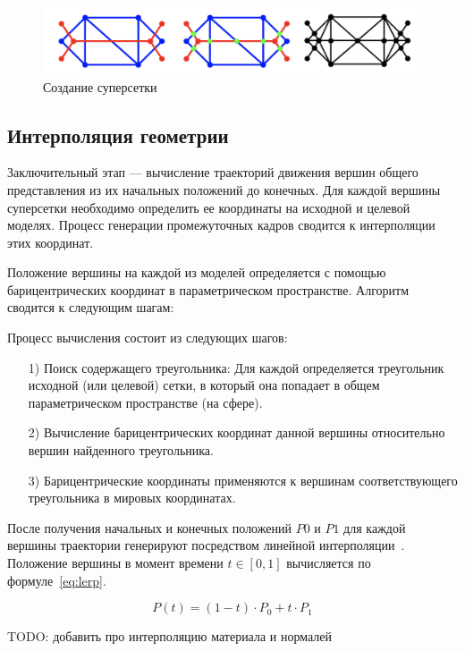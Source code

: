 \begin{figure}[H]
    \centering
    \includegraphics[width=\textwidth]{../inc/images/supermesh}
    \caption{Создание суперсетки}
    \label{fig:supermesh}
\end{figure}

\subsection{Интерполяция геометрии}
Заключительный этап --- вычисление траекторий движения вершин общего представления из их начальных положений до конечных. Для каждой вершины суперсетки необходимо определить ее координаты на исходной и целевой моделях. Процесс генерации промежуточных кадров сводится к интерполяции этих координат.

Положение вершины на каждой из моделей определяется с помощью барицентрических координат в параметрическом пространстве\cite{mocanu,alexa}. Алгоритм сводится к следующим шагам:

Процесс вычисления состоит из следующих шагов:
\begin{enumerate}
    \item[1)] Поиск содержащего треугольника: Для каждой определяется треугольник исходной (или целевой) сетки, в который она попадает в общем параметрическом пространстве (на сфере).
    \item[2)] Вычисление барицентрических координат данной вершины относительно вершин найденного треугольника.
    \item[3)] Барицентрические координаты применяются к вершинам соответствующего треугольника в мировых координатах.
\end{enumerate}

После получения начальных и конечных положений $P0$ и $P1$ для каждой вершины траектории генерируют посредством линейной интерполяции~\cite{mocanu,alexa}. Положение вершины в момент времени $t\in [0,1]$ вычисляется по формуле~\eqref{eq:lerp}.

\begin{equation}
    \label{eq:lerp}
    P(t) = (1 - t) \cdot P_0 + t \cdot P_1
\end{equation}

TODO: добавить про интерполяцию материала и нормалей


